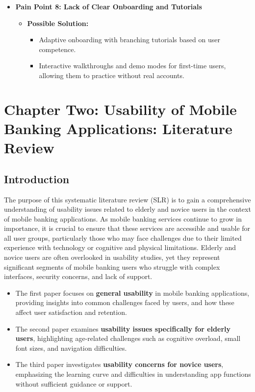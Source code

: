 \documentclass[a4paper,12pt]{report}
\begin{document}
\begin{itemize}
  \item \textbf{Pain Point 8: Lack of Clear Onboarding and Tutorials}
        \begin{itemize}
          \item \textbf{Possible Solution:}
                \begin{itemize}
                  \item Adaptive onboarding with branching tutorials based on user competence.
                  \item Interactive walkthroughs and demo modes for first-time users, allowing them to practice without real accounts.
                \end{itemize}
        \end{itemize}

\end{itemize}

\newpage
\chapter*{Chapter Two: Usability of Mobile Banking Applications: Literature Review}
\setcounter{chapter}{2}
\setcounter{section}{0}
\section{Introduction}
The purpose of this systematic literature review (SLR) is to gain a comprehensive understanding of usability issues related to elderly and novice users in the context of mobile banking applications. As mobile banking services continue to grow in importance, it is crucial to ensure that these services are accessible and usable for all user groups, particularly those who may face challenges due to their limited experience with technology or cognitive and physical limitations. Elderly and novice users are often overlooked in usability studies, yet they represent significant segments of mobile banking users who struggle with complex interfaces, security concerns, and lack of support.

\begin{itemize}
  \item The first paper focuses on \textbf{general usability} in mobile banking applications, providing insights into common challenges faced by users, and how these affect user satisfaction and retention.
  \item The second paper examines \textbf{usability issues specifically for elderly users}, highlighting age-related challenges such as cognitive overload, small font sizes, and navigation difficulties.
  \item The third paper investigates \textbf{usability concerns for novice users}, emphasizing the learning curve and difficulties in understanding app functions without sufficient guidance or support.
\end{itemize}
\end{document}
